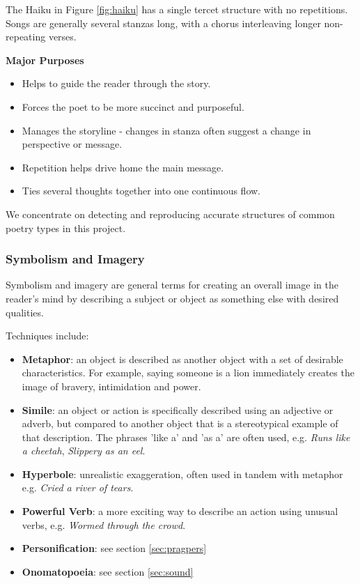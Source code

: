 The Haiku in Figure \ref{fig:haiku} has a single tercet structure with no repetitions. Songs are generally several stanzas long, with a chorus interleaving longer non-repeating verses.

\textbf{Major Purposes}
\begin{itemize}
\item{Helps to guide the reader through the story.}
\item{Forces the poet to be more succinct and purposeful.}
\item{Manages the storyline - changes in stanza often suggest a change in perspective or message.}
\item{Repetition helps drive home the main message.}
\item{Ties several thoughts together into one continuous flow.}
\end{itemize} 

We concentrate on detecting and reproducing accurate structures of common poetry types in this project.

\subsubsection{Symbolism and Imagery}
\label{sec:symbol}
Symbolism and imagery are general terms for creating an overall image in the reader's mind by describing a subject or object as something else with desired qualities.

Techniques include:
\begin{itemize}
\item{\textbf{Metaphor}: an object is described as another object with a set of desirable characteristics. For example, saying someone is a lion immediately creates the image of bravery, intimidation and power.}
\item{\textbf{Simile}: an object or action is specifically described using an adjective or adverb, but compared to another object that is a stereotypical example of that description. The phrases 'like a' and 'as a' are often used, e.g. \textit{Runs like a cheetah}, \textit{Slippery as an eel}.}
\item{\textbf{Hyperbole}: unrealistic exaggeration, often used in tandem with metaphor e.g. \textit{Cried a river of tears}.}
\item{\textbf{Powerful Verb}: a more exciting way to describe an action using unusual verbs, e.g. \textit{Wormed through the crowd}.}
\item{\textbf{Personification}: see section \ref{sec:pragpers}}
\item{\textbf{Onomatopoeia}: see section \ref{sec:sound}}
\end{itemize}

